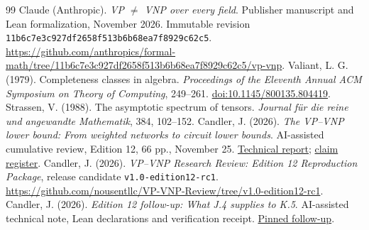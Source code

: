 \documentclass[11pt,letterpaper]{article}
\theoremstyle{definition}\newtheorem{definition}[theorem]{Definition}\newtheorem{example}[theorem]{Example}
\theoremstyle{remark}\newtheorem{remark}[theorem]{Remark}
\newcommand{\aud}[2]{\href{https://github.com/nousentllc/VP-VNP-Review/blob/567303d0bcf4f9d54390437b137752446e58ccd6/#1}{#2}}
\newcommand{\follow}[2]{\href{https://github.com/nousentllc/VP-VNP-Review/blob/8a7976933b6b2b4ffda1ad3a0dfb5fc6b6f023e8/#1}{#2}}
\begin{document}
\begin{thebibliography}{99}
 Claude (Anthropic). \emph{VP $\ne$ VNP over every field}. Publisher manuscript and Lean formalization, November 2026. Immutable revision \nolinkurl{11b6c7e3c927df2658f513b6b68ea7f8929c62c5}. \url{https://github.com/anthropics/formal-math/tree/11b6c7e3c927df2658f513b6b68ea7f8929c62c5/vp-vnp}.
 Valiant, L. G. (1979). Completeness classes in algebra. \emph{Proceedings of the Eleventh Annual ACM Symposium on Theory of Computing}, 249--261. \href{https://doi.org/10.1145/800135.804419}{doi:10.1145/800135.804419}.
 Strassen, V. (1988). The asymptotic spectrum of tensors. \emph{Journal f\"ur die reine und angewandte Mathematik}, 384, 102--152.
 Candler, J. (2026). \emph{The VP--VNP lower bound: From weighted networks to circuit lower bounds}. AI-assisted cumulative review, Edition 12, 66 pp., November 25. \aud{report/VP_VNP_Research_Review.pdf}{Technical report}; \aud{report/proof-coverage.csv}{claim register}.
 Candler, J. (2026). \emph{VP--VNP Research Review: Edition 12 Reproduction Package}, release candidate \texttt{v1.0-edition12-rc1}. \url{https://github.com/nousentllc/VP-VNP-Review/tree/v1.0-edition12-rc1}.
 Candler, J. (2026). \emph{Edition 12 follow-up: What J.4 supplies to K.5}. AI-assisted technical note, Lean declarations and verification receipt. \follow{followups/j4/README.md}{Pinned follow-up}.
\end{thebibliography}
\end{document}
